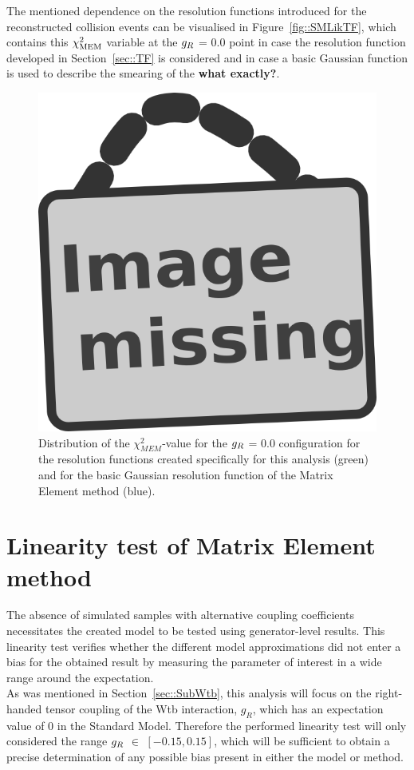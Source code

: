 The mentioned dependence on the resolution functions introduced for the reconstructed collision events can be visualised in Figure~\ref{fig::SMLikTF}, which contains this $\chi^{2}_{\textrm{MEM}}$ variable at the $g_{R}$ = 0.0 point in case the resolution function developed in Section~\ref{sec::TF} is considered and in case a basic Gaussian function is used to describe the smearing of the \textbf{what exactly?}. 
\begin{figure}[h!t]
 \centering
 \includegraphics[width = 0.35 \textwidth]{image.png} %
 \caption{Distribution of the $\chi^{2}_{MEM}$-value for the $g_{R}$ = $0.0$ configuration for the resolution functions created specifically for this analysis (green) and for the basic Gaussian resolution function of the Matrix Element method (blue).} \label{Fig::SMLikTF}
\end{figure}

\section{Linearity test of Matrix Element method}\label{sec::CalibCurve}

The absence of simulated samples with alternative coupling coefficients necessitates the created model to be tested using generator-level results. This linearity test verifies whether the different model approximations did not enter a bias for the obtained result by measuring the parameter of interest in a wide range around the expectation.
\\
As was mentioned in Section~\ref{sec::SubWtb}, this analysis will focus on the right-handed tensor coupling of the Wtb interaction, $g_{R}$, which has an expectation value of $0$ in the Standard Model. Therefore the performed linearity test will only considered the range $g_{R}$ $\in$ $\left[-0.15, 0.15\right]$, which will be sufficient to obtain a precise determination of any possible bias present in either the model or method.
\\

